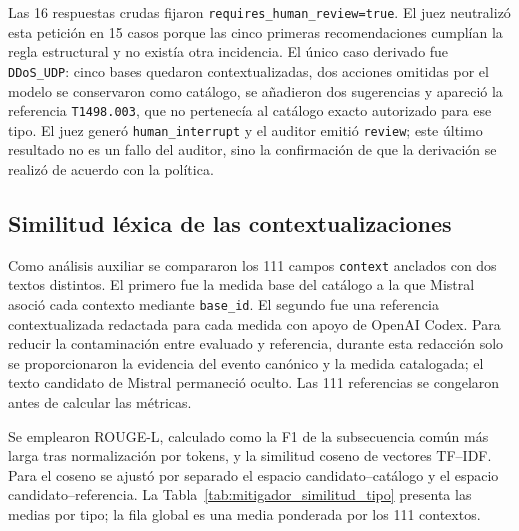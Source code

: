 Las 16 respuestas crudas fijaron
\texttt{requires\_human\_review=true}. El juez neutralizó esta petición en 15
casos porque las cinco primeras recomendaciones cumplían la regla estructural
y no existía otra incidencia. El único caso derivado fue
\texttt{DDoS\_UDP}: cinco bases quedaron contextualizadas, dos acciones
omitidas por el modelo se conservaron como catálogo, se añadieron dos
sugerencias y apareció la referencia \texttt{T1498.003}, que no pertenecía al
catálogo exacto autorizado para ese tipo. El juez generó
\texttt{human\_interrupt} y el auditor emitió \texttt{review}; este último
resultado no es un fallo del auditor, sino la confirmación de que la derivación
se realizó de acuerdo con la política.

\subsection*{Similitud léxica de las contextualizaciones}

Como análisis auxiliar se compararon los 111 campos \texttt{context} anclados
con dos textos distintos. El primero fue la medida base del catálogo a la que
Mistral asoció cada contexto mediante \texttt{base\_id}. El segundo fue una
referencia contextualizada redactada para cada medida con apoyo de OpenAI
Codex. Para reducir la contaminación entre evaluado y referencia, durante esta
redacción solo se proporcionaron la evidencia del evento canónico y la medida
catalogada; el texto candidato de Mistral permaneció oculto. Las 111
referencias se congelaron antes de calcular las métricas.

Se emplearon ROUGE-L, calculado como la F1 de la subsecuencia común más larga
tras normalización por tokens, y la similitud coseno de vectores TF--IDF. Para
el coseno se ajustó por separado el espacio candidato--catálogo y el espacio
candidato--referencia. La Tabla~\ref{tab:mitigador_similitud_tipo} presenta las
medias por tipo; la fila global es una media ponderada por los 111 contextos.

